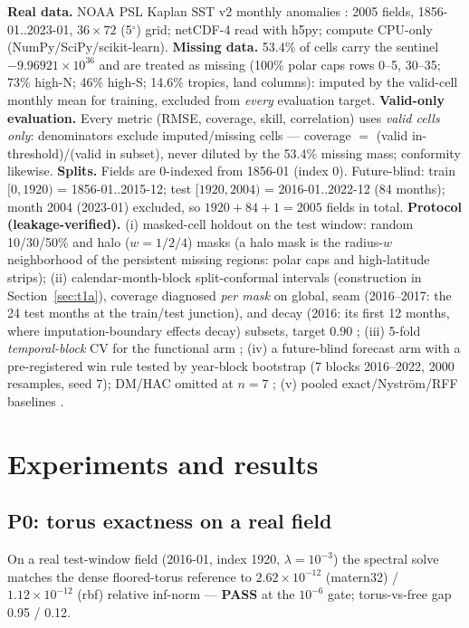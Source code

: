 \documentclass{article}
\begin{document}
\textbf{Real data.} NOAA PSL Kaplan SST v2 monthly anomalies
\cite{kaplan1998analyses}: 2005 fields, 1856-01..2023-01, $36\times72$
(5$^\circ$) grid; netCDF-4 read with h5py; compute CPU-only
(NumPy/SciPy/scikit-learn). \textbf{Missing data.} 53.4\% of cells
carry the sentinel $-9.96921\times10^{36}$ and are treated as missing (100\%
polar caps rows 0--5, 30--35; 73\% high-N; 46\% high-S; 14.6\% tropics, land
columns): imputed by the valid-cell monthly mean for training, excluded from
\emph{every} evaluation target. \textbf{Valid-only evaluation.} Every metric
(RMSE, coverage, skill, correlation) uses \emph{valid cells only}:
denominators exclude imputed/missing cells --- coverage $=$ (valid
in-threshold)/(valid in subset), never diluted by the 53.4\% missing
mass; conformity likewise. \textbf{Splits.} Fields are 0-indexed from 1856-01 (index 0).
Future-blind: train $[0,1920)$ = 1856-01..2015-12; test $[1920,2004)$ =
2016-01..2022-12 (84 months); month 2004 (2023-01) excluded, so
$1920{+}84{+}1{=}2005$ fields in total.
\textbf{Protocol (leakage-verified).} (i) masked-cell holdout on the test
window: random 10/30/50\% and halo ($w{=}1/2/4$) masks (a halo mask is the
radius-$w$ neighborhood of the persistent missing regions: polar caps and
high-latitude strips); (ii)
calendar-month-block split-conformal intervals (construction in
Section~\ref{sec:t1a}), coverage diagnosed \emph{per mask} on global, seam
(2016--2017: the 24 test months at the train/test junction), and decay
(2016: its first 12 months, where imputation-boundary effects decay)
subsets, target 0.90
\cite{barber2023conformal,chernozhukov2018exact,gibbs2021adaptive}; (iii)
5-fold \emph{temporal-block} CV for the functional arm \cite{bergmeir2012use};
(iv) a future-blind forecast arm with a pre-registered win rule tested by
year-block bootstrap \cite{kunsch1989jackknife} (7 blocks 2016--2022, 2000
resamples, seed 7); DM/HAC
omitted at $n{=}7$ \cite{diebold1995comparing}; (v) pooled exact/Nystr\"om/RFF baselines
\cite{rahimi2007random,williams2001using,pedregosa2011scikit}.

\section{Experiments and results}
\label{sec:results}

\subsection{P0: torus exactness on a real field}
\label{sec:p0}
On a real test-window field (2016-01, index 1920, $\lambda{=}10^{-3}$) the
spectral solve matches the dense floored-torus reference to
$2.62\times10^{-12}$ (matern32) / $1.12\times10^{-12}$ (rbf) relative inf-norm
--- \textbf{PASS} at the $10^{-6}$ gate; torus-vs-free gap 0.95 / 0.12.
\end{document}
